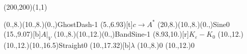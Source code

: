\unitlength=1bp%

\begin{feynartspicture}(200,200)(1,1)

\FADiagram{}
\FAProp(0.,8.)(10.,8.)(0.,){GhostDash}{-1}
\FALabel(5.,6.93)[t]{$c\to A^*$}
\FAProp(20,8.)(10.,8.)(0.,){Sine}{0}
\FALabel(15.,9.07)[b]{$A|_V$}
\FAProp(10.,8.)(10.,12.)(0.,){BandSine}{-1}
\FALabel(8.93,10.)[r]{$K_\varepsilon-K_0$}
\FAProp(10.,12.)(10.,12.)(10.,16.5){Straight}{0}
\FALabel(10.,17.32)[b]{$\lambda$}
\FAVert(10.,8.){0}
\FAVert(10.,12.){0}
\end{feynartspicture}

